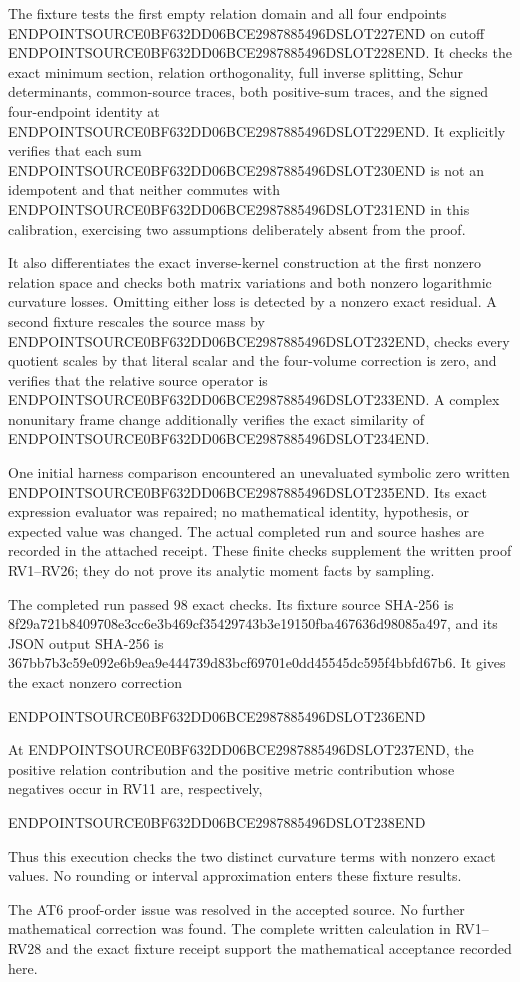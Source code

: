 The fixture tests the first empty relation domain and all four endpoints ENDPOINTSOURCE0BF632DD06BCE2987885496DSLOT227END on cutoff ENDPOINTSOURCE0BF632DD06BCE2987885496DSLOT228END. It checks the exact minimum section, relation orthogonality, full inverse splitting, Schur determinants, common-source traces, both positive-sum traces, and the signed four-endpoint identity at ENDPOINTSOURCE0BF632DD06BCE2987885496DSLOT229END. It explicitly verifies that each sum ENDPOINTSOURCE0BF632DD06BCE2987885496DSLOT230END is not an idempotent and that neither commutes with ENDPOINTSOURCE0BF632DD06BCE2987885496DSLOT231END in this calibration, exercising two assumptions deliberately absent from the proof.

It also differentiates the exact inverse-kernel construction at the first nonzero relation space and checks both matrix variations and both nonzero logarithmic curvature losses. Omitting either loss is detected by a nonzero exact residual. A second fixture rescales the source mass by ENDPOINTSOURCE0BF632DD06BCE2987885496DSLOT232END, checks every quotient scales by that literal scalar and the four-volume correction is zero, and verifies that the relative source operator is ENDPOINTSOURCE0BF632DD06BCE2987885496DSLOT233END. A complex nonunitary frame change additionally verifies the exact similarity of ENDPOINTSOURCE0BF632DD06BCE2987885496DSLOT234END.

One initial harness comparison encountered an unevaluated symbolic zero written ENDPOINTSOURCE0BF632DD06BCE2987885496DSLOT235END. Its exact expression evaluator was repaired; no mathematical identity, hypothesis, or expected value was changed. The actual completed run and source hashes are recorded in the attached receipt. These finite checks supplement the written proof RV1--RV26; they do not prove its analytic moment facts by sampling.

The completed run passed 98 exact checks. Its fixture source SHA-256 is 8f29a721b8409708e3cc6e3b469cf35429743b3e19150fba467636d98085a497, and its JSON output SHA-256 is 367bb7b3c59e092e6b9ea9e444739d83bcf69701e0dd45545dc595f4bbfd67b6. It gives the exact nonzero correction

ENDPOINTSOURCE0BF632DD06BCE2987885496DSLOT236END

At ENDPOINTSOURCE0BF632DD06BCE2987885496DSLOT237END, the positive relation contribution and the positive metric contribution whose negatives occur in RV11 are, respectively,

ENDPOINTSOURCE0BF632DD06BCE2987885496DSLOT238END

Thus this execution checks the two distinct curvature terms with nonzero exact values. No rounding or interval approximation enters these fixture results.

The AT6 proof-order issue was resolved in the accepted source. No further mathematical correction was found. The complete written calculation in RV1--RV28 and the exact fixture receipt support the mathematical acceptance recorded here.
